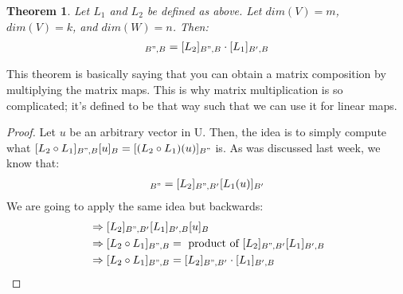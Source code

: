 \documentclass[a4paper, 12pt]{article}
\newtheorem{theorem}{Theorem}
\theoremstyle{definition}
\theoremstyle{definition}
\theoremstyle{definition}
\theoremstyle{definition}
\begin{document}
{\begin{theorem}
	Let $L_1$ and $L_2$ be defined as above. Let $dim(V) = m$, $dim(V) = k$, and $dim(W) = n$. Then: 
	\begin{align*}
		[L_2 \circ L_1 ]_{B", B} = [L_2]_{B",B} \cdot [L_1]_{B',B} 
	\end{align*}
\end{theorem}
This theorem is basically saying that you can obtain a matrix composition by multiplying the matrix maps. This is why matrix multiplication is so complicated; it's defined to be that way such that we can use it for linear maps. 
\begin{proof}
	Let $u$ be an arbitrary vector in U. Then, the idea is to simply compute what $[L_2 \circ L_1]_{B", B} [u]_B = [(L_2 \circ L_1)(u)]_{B"}$ is. As was discussed last week, we know that: 
	\begin{align*}
		[L_2(L_1(u))]_{B"} = [L_2]_{B", B'}[L_1(u)]_{B'}
	\end{align*}
	We are going to apply the same idea but backwards: 
	\begin{align*}
		& \Rightarrow [L_2]_{B", B'} [L_1]_{B',B}[u]_B \\
		& \Rightarrow [L_2 \circ L_1]_{B", B} = \mbox{ product of } [L_2]_{B",B'}[L_1]_{B',B} \\
		& \Rightarrow [L_2 \circ L_1]_{B", B} = [L_2]_{B", B'} \cdot [L_1]_{B', B} 
	\end{align*}
\end{proof}

}
\end{document}
